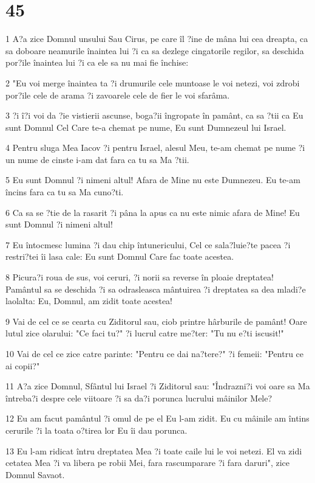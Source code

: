 \chapter{45}

\par 1 A?a zice Domnul unsului Sau Cirus, pe care îl ?ine de mâna lui cea dreapta, ca sa doboare neamurile înaintea lui ?i ca sa dezlege cingatorile regilor, sa deschida por?ile înaintea lui ?i ca ele sa nu mai fie închise:
\par 2 "Eu voi merge înaintea ta ?i drumurile cele muntoase le voi netezi, voi zdrobi por?ile cele de arama ?i zavoarele cele de fier le voi sfarâma.
\par 3 ?i î?i voi da ?ie vistierii ascunse, boga?ii îngropate în pamânt, ca sa ?tii ca Eu sunt Domnul Cel Care te-a chemat pe nume, Eu sunt Dumnezeul lui Israel.
\par 4 Pentru sluga Mea Iacov ?i pentru Israel, alesul Meu, te-am chemat pe nume ?i un nume de cinste i-am dat fara ca tu sa Ma ?tii.
\par 5 Eu sunt Domnul ?i nimeni altul! Afara de Mine nu este Dumnezeu. Eu te-am încins fara ca tu sa Ma cuno?ti.
\par 6 Ca sa se ?tie de la rasarit ?i pâna la apus ca nu este nimic afara de Mine! Eu sunt Domnul ?i nimeni altul!
\par 7 Eu întocmesc lumina ?i dau chip întunericului, Cel ce sala?luie?te pacea ?i restri?tei îi lasa cale: Eu sunt Domnul Care fac toate acestea.
\par 8 Picura?i roua de sus, voi ceruri, ?i norii sa reverse în ploaie dreptatea! Pamântul sa se deschida ?i sa odrasleasca mântuirea ?i dreptatea sa dea mladi?e laolalta: Eu, Domnul, am zidit toate acestea!
\par 9 Vai de cel ce se cearta cu Ziditorul sau, ciob printre hârburile de pamânt! Oare lutul zice olarului: "Ce faci tu?" ?i lucrul catre me?ter: "Tu nu e?ti iscusit!"
\par 10 Vai de cel ce zice catre parinte: "Pentru ce dai na?tere?" ?i femeii: "Pentru ce ai copii?"
\par 11 A?a zice Domnul, Sfântul lui Israel ?i Ziditorul sau: "Îndrazni?i voi oare sa Ma întreba?i despre cele viitoare ?i sa da?i porunca lucrului mâinilor Mele?
\par 12 Eu am facut pamântul ?i omul de pe el Eu l-am zidit. Eu cu mâinile am întins cerurile ?i la toata o?tirea lor Eu îi dau porunca.
\par 13 Eu l-am ridicat întru dreptatea Mea ?i toate caile lui le voi netezi. El va zidi cetatea Mea ?i va libera pe robii Mei, fara rascumparare ?i fara daruri", zice Domnul Savaot.

